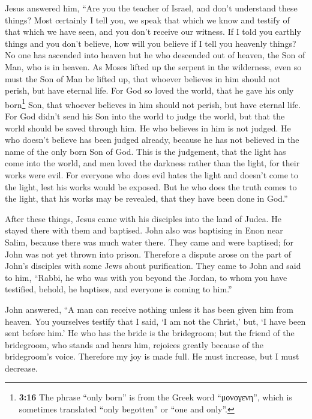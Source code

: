  Jesus answered him, ``Are you the teacher of Israel, and
don't understand these things?  Most certainly I tell
you, we speak that which we know and testify of that which we have seen,
and you don't receive our witness.  If I told you earthly
things and you don't believe, how will you believe if I tell you
heavenly things?  No one has ascended into heaven but he
who descended out of heaven, the Son of Man, who is in heaven.
 As Moses lifted up the serpent in the wilderness, even
so must the Son of Man be lifted up,  that whoever
believes in him should not perish, but have eternal life.
 For God so loved the world, that he gave his only
born\footnote{\textbf{3:16} The phrase ``only born'' is from the Greek
  word ``μονογενη'', which is sometimes translated ``only begotten'' or
  ``one and only''.} Son, that whoever believes in him should not
perish, but have eternal life.  For God didn't send his
Son into the world to judge the world, but that the world should be
saved through him.  He who believes in him is not judged.
He who doesn't believe has been judged already, because he has not
believed in the name of the only born Son of God.  This
is the judgement, that the light has come into the world, and men loved
the darkness rather than the light, for their works were evil.
 For everyone who does evil hates the light and doesn't
come to the light, lest his works would be exposed.  But
he who does the truth comes to the light, that his works may be
revealed, that they have been done in God.''

 After these things, Jesus came with his disciples into
the land of Judea. He stayed there with them and baptised.
 John also was baptising in Enon near Salim, because
there was much water there. They came and were baptised; 
for John was not yet thrown into prison.  Therefore a
dispute arose on the part of John's disciples with some Jews about
purification.  They came to John and said to him,
``Rabbi, he who was with you beyond the Jordan, to whom you have
testified, behold, he baptises, and everyone is coming to him.''

 John answered, ``A man can receive nothing unless it has
been given him from heaven.  You yourselves testify that
I said, `I am not the Christ,' but, `I have been sent before him.'
 He who has the bride is the bridegroom; but the friend
of the bridegroom, who stands and hears him, rejoices greatly because of
the bridegroom's voice. Therefore my joy is made full. 
He must increase, but I must decrease.

